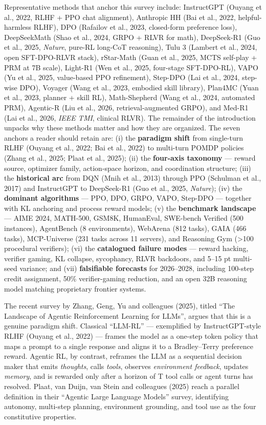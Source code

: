 Representative methods that anchor this survey include: InstructGPT (Ouyang et al., 2022, RLHF + PPO chat alignment), Anthropic HH (Bai et al., 2022, helpful-harmless RLHF), DPO (Rafailov et al., 2023, closed-form preference loss), DeepSeekMath (Shao et al., 2024, GRPO + RLVR for math), DeepSeek-R1 (Guo et al., 2025, \emph{Nature}, pure-RL long-CoT reasoning), Tulu 3 (Lambert et al., 2024, open SFT-DPO-RLVR stack), rStar-Math (Guan et al., 2025, MCTS self-play + PRM at 7B scale), Light-R1 (Wen et al., 2025, four-stage SFT-DPO-RL), VAPO (Yu et al., 2025, value-based PPO refinement), Step-DPO (Lai et al., 2024, step-wise DPO), Voyager (Wang et al., 2023, embodied skill library), Plan4MC (Yuan et al., 2023, planner + skill RL), Math-Shepherd (Wang et al., 2024, automated PRM), Agentic-R (Liu et al., 2026, retrieval-augmented GRPO), and Med-R1 (Lai et al., 2026, \emph{IEEE TMI}, clinical RLVR). The remainder of the introduction unpacks why these methods matter and how they are organized. The seven anchors a reader should retain are: (i) the \textbf{paradigm shift} from single-turn RLHF (Ouyang et al., 2022; Bai et al., 2022) to multi-turn POMDP policies (Zhang et al., 2025; Plaat et al., 2025); (ii) the \textbf{four-axis taxonomy} --- reward source, optimizer family, action-space horizon, and coordination structure; (iii) the \textbf{historical arc} from DQN (Mnih et al., 2013) through PPO (Schulman et al., 2017) and InstructGPT to DeepSeek-R1 (Guo et al., 2025, \emph{Nature}); (iv) the \textbf{dominant algorithms} --- PPO, DPO, GRPO, VAPO, Step-DPO --- together with KL anchoring and process reward models; (v) the \textbf{benchmark landscape} --- AIME 2024, MATH-500, GSM8K, HumanEval, SWE-bench Verified (500 instances), AgentBench (8 environments), WebArena (812 tasks), GAIA (466 tasks), MCP-Universe (231 tasks across 11 servers), and Reasoning Gym (\textgreater100 procedural verifiers); (vi) the \textbf{catalogued failure modes} --- reward hacking, verifier gaming, KL collapse, sycophancy, RLVR backdoors, and 5--15 pt multi-seed variance; and (vii) \textbf{falsifiable forecasts} for 2026--2028, including 100-step credit assignment, 50\% verifier-gaming reduction, and an open 32B reasoning model matching proprietary frontier systems.

The recent survey by Zhang, Geng, Yu and colleagues (2025), titled ``The Landscape of Agentic Reinforcement Learning for LLMs'', argues that this is a genuine paradigm shift. Classical ``LLM-RL'' --- exemplified by InstructGPT-style RLHF (Ouyang et al., 2022) --- frames the model as a one-step token policy that maps a prompt to a single response and aligns it to a Bradley--Terry preference reward. Agentic RL, by contrast, reframes the LLM as a sequential decision maker that emits \emph{thoughts}, calls \emph{tools}, observes \emph{environment feedback}, updates \emph{memory}, and is rewarded only after a horizon of T tool calls or agent turns has resolved. Plaat, van Duijn, van Stein and colleagues (2025) reach a parallel definition in their ``Agentic Large Language Models'' survey, identifying autonomy, multi-step planning, environment grounding, and tool use as the four constitutive properties.

